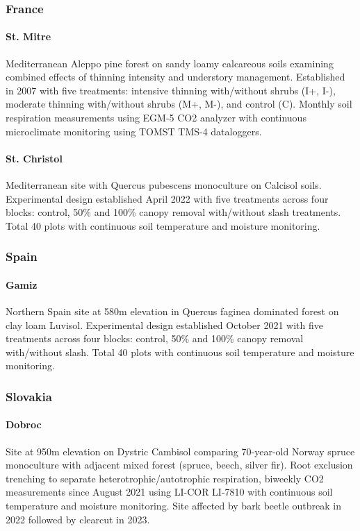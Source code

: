 \documentclass[12pt,a4paper]{article}
\begin{document}
\subsubsection{France}
\paragraph{St. Mitre} Mediterranean Aleppo pine forest on sandy loamy calcareous soils examining combined effects of thinning intensity and understory management. Established in 2007 with five treatments: intensive thinning with/without shrubs (I+, I-), moderate thinning with/without shrubs (M+, M-), and control (C). Monthly soil respiration measurements using EGM-5 CO2 analyzer with continuous microclimate monitoring using TOMST TMS-4 dataloggers.
\paragraph{St. Christol} Mediterranean site with Quercus pubescens monoculture on Calcisol soils. Experimental design established April 2022 with five treatments across four blocks: control, 50\% and 100\% canopy removal with/without slash treatments. Total 40 plots with continuous soil temperature and moisture monitoring.

\subsubsection{Spain}
\paragraph{Gamiz} Northern Spain site at 580m elevation in Quercus faginea dominated forest on clay loam Luvisol. Experimental design established October 2021 with five treatments across four blocks: control, 50\% and 100\% canopy removal with/without slash. Total 40 plots with continuous soil temperature and moisture monitoring.

\subsubsection{Slovakia}
\paragraph{Dobroc} Site at 950m elevation on Dystric Cambisol comparing 70-year-old Norway spruce monoculture with adjacent mixed forest (spruce, beech, silver fir). Root exclusion trenching to separate heterotrophic/autotrophic respiration, biweekly CO2 measurements since August 2021 using LI-COR LI-7810 with continuous soil temperature and moisture monitoring. Site affected by bark beetle outbreak in 2022 followed by clearcut in 2023.
\end{document}
